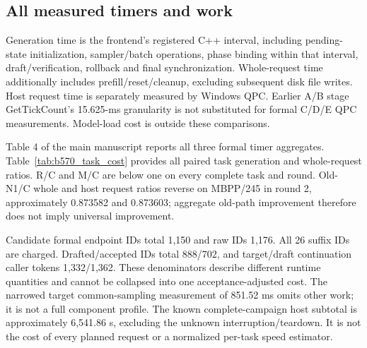 \subsection{All measured timers and work}
Generation time is the frontend's registered C++ interval, including pending-state initialization, sampler/batch operations, phase binding within that interval, draft/verification, rollback and final synchronization. Whole-request time additionally includes prefill/reset/cleanup, excluding subsequent disk file writes. Host request time is separately measured by Windows QPC. Earlier A/B stage GetTickCount's 15.625-ms granularity is not substituted for formal C/D/E QPC measurements. Model-load cost is outside these comparisons.

Table 4 of the main manuscript reports all three formal timer aggregates. Table~\ref{tab:b570_task_cost} provides all paired task generation and whole-request ratios. R/C and M/C are below one on every complete task and round. Old-N1/C whole and host request ratios reverse on MBPP/245 in round 2, approximately 0.873582 and 0.873603; aggregate old-path improvement therefore does not imply universal improvement.



Candidate formal endpoint IDs total 1,150 and raw IDs 1,176. All 26 suffix IDs are charged. Drafted/accepted IDs total 888/702, and target/draft continuation caller tokens 1,332/1,362. These denominators describe different runtime quantities and cannot be collapsed into one acceptance-adjusted cost. The narrowed target common-sampling measurement of 851.52 ms omits other work; it is not a full component profile. The known complete-campaign host subtotal is approximately 6,541.86 s, excluding the unknown interruption/teardown. It is not the cost of every planned request or a normalized per-task speed estimator.
